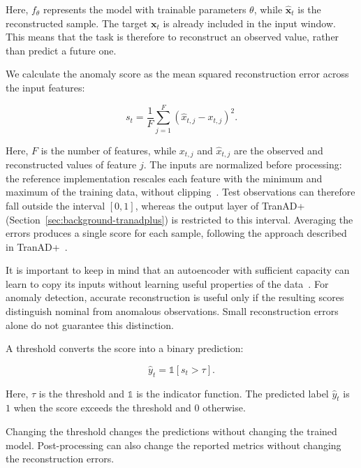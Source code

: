 Here, $f_{\theta}$ represents the model with trainable parameters
$\theta$, while $\widehat{\mathbf{x}}_t$ is the reconstructed sample.
The target $\mathbf{x}_t$ is already included in the input window.
This means that the task is therefore to reconstruct an observed value, rather than
predict a future one.

We calculate the anomaly score as the mean squared reconstruction
error across the input features:

\begin{equation}
  s_t = \frac{1}{F}\sum_{j=1}^{F}
  \left(\widehat{x}_{t,j}-x_{t,j}\right)^2.
  \label{eq:background-mse-score}
\end{equation}

Here, $F$ is the number of features, while $x_{t,j}$ and
$\widehat{x}_{t,j}$ are the observed and reconstructed values
of feature $j$. The inputs are normalized before processing:
the reference implementation rescales each feature with the minimum
and maximum of the training data, without clipping~\cite{TranADPlusReferenceCode}.
Test observations can therefore fall outside the interval $[0,1]$,
whereas the output layer of TranAD+ (Section~\ref{sec:background-tranadplus})
is restricted to this interval.
Averaging the errors produces a single score for each sample,
following the approach described in
TranAD+~\cite{Yermakov2025TranADPlus}.

It is important to keep in mind that an
autoencoder with sufficient capacity can learn to copy its
inputs without learning useful properties of the
data~\cite{Goodfellow2016DeepLearning}.
For anomaly detection, accurate reconstruction is useful only
if the resulting scores distinguish nominal from anomalous
observations. Small reconstruction errors alone do not guarantee
this distinction.

A threshold converts the score into a binary prediction:

\begin{equation}
  \widehat{y}_t = \mathbb{1}\!\left[s_t>\tau\right].
  \label{eq:background-threshold}
\end{equation}

Here, $\tau$ is the threshold and $\mathbb{1}$ is the indicator
function. The predicted label $\widehat{y}_t$ is $1$ when the score
exceeds the threshold and $0$ otherwise.

Changing the threshold changes the predictions without changing
the trained model. Post-processing can also change the reported
metrics without changing the reconstruction errors.

